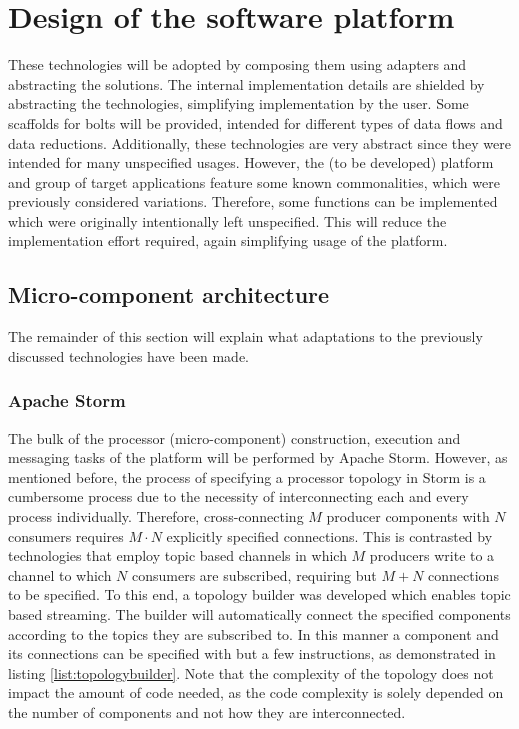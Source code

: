 \section{Design of the software platform}
These technologies will be adopted by composing them using adapters and abstracting the solutions. The internal implementation details are shielded by abstracting the technologies, simplifying implementation by the user. Some scaffolds for bolts will be provided, intended for different types of data flows and data reductions. Additionally, these technologies are very abstract since they were intended for many unspecified usages. However, the (to be developed) platform and group of target applications feature some known commonalities, which were previously considered variations. Therefore, some functions can be implemented which were originally intentionally left unspecified. This will reduce the implementation effort required, again simplifying usage of the platform.

\subsection{Micro-component architecture}
The remainder of this section will explain what adaptations to the previously discussed technologies have been made.

\subsubsection*{Apache Storm}
The bulk of the processor (micro-component) construction, execution and messaging tasks of the platform will be performed by Apache Storm. However, as mentioned before, the process of specifying a processor topology in Storm is a cumbersome process due to the necessity of interconnecting each and every process individually. Therefore, cross-connecting $M$ producer components with $N$ consumers requires $M\cdot N$ explicitly specified connections. This is contrasted by technologies that employ topic based channels in which $M$ producers write to a channel to which $N$ consumers are subscribed, requiring but $M+N$ connections to be specified. To this end, a topology builder was developed which enables topic based streaming. The builder will automatically connect the specified components according to the topics they are subscribed to. In this manner a component and its connections can be specified with but a few instructions, as demonstrated in listing \ref{list:topologybuilder}. Note that the complexity of the topology does not impact the amount of code needed, as the code complexity is solely depended on the number of components and not how they are interconnected.

